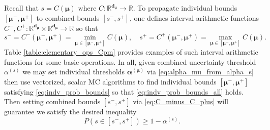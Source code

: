 \documentclass[graybox]{svmult}
\begin{document}
Recall that $s = C(\boldsymbol{\mu})$ where $C: \mathbb{R}^{\boldsymbol{d}_{\boldsymbol{\mu}}} \to \mathbb{R}$. To propagate individual bounds $[\boldsymbol{\mu}^-,\boldsymbol{\mu}^+]$ to combined bounds $[s^-,s^+]$, one defines interval arithmetic \cite{interval_analysis} functions $C^-,C^+: \mathbb{R}^{\boldsymbol{d}_{\boldsymbol{\mu}}} \times \mathbb{R}^{\boldsymbol{d}_{\boldsymbol{\mu}}} \to \mathbb{R}$ so that
\begin{equation}
    s^- = C^-(\boldsymbol{\mu}^-,\boldsymbol{\mu}^+) = \min_{\boldsymbol{\mu} \in [\boldsymbol{\mu}^-,\boldsymbol{\mu}^+]} C(\boldsymbol{\mu}), \quad 
    s^+= C^+(\boldsymbol{\mu}^-,\boldsymbol{\mu}^+) = \max_{\boldsymbol{\mu} \in [\boldsymbol{\mu}^-,\boldsymbol{\mu}^+]} C(\boldsymbol{\mu}).
    \label{eq:C_minus_C_plus}
\end{equation}
Table \ref{table:elementary_ops_Cpm} provides examples of such interval arithmetic functions for some basic operations. In all, given combined uncertainty threshold $\alpha^{(s)}$ we may set individual thresholds $\boldsymbol{\alpha}^{(\boldsymbol{\mu})}$ via \eqref{eq:alpha_mu_from_alpha_s} then use vectorized, scalar MC algorithms to find individual bounds $[\boldsymbol{\mu}^-,\boldsymbol{\mu}^+]$ satisfying \eqref{eq:indv_prob_bounds} so that \eqref{eq:indv_prob_bounds_all} holds. Then setting combined bounds $[s^-,s^+]$ via \eqref{eq:C_minus_C_plus} will guarantee we satisfy the desired inequality 
$$P(s \in [s^-,s^+]) \geq 1-\alpha^{(s)}.$$
\end{document}
